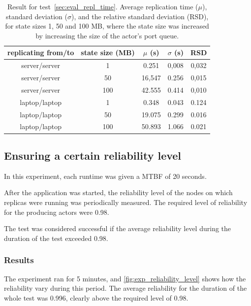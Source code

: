 \documentclass{cslthse-msc}
\begin{document}
\begin{table}[h!]
	\begin{center}
	\begin{tabular}{| c | c | c | c | c |}
	 \hline
	 replicating from/to & state size (MB) & $\mu$ (s) & $\sigma$ (s) & RSD \\
	 \hline		%
	  server/server & 1 & 0.251 & 0,008 & 0,032 \\
	  server/server & 50 & 16,547 & 0.256 & 0,015 \\
	  server/server & 100 & 42.555 & 0.414 & 0,010 \\
	  laptop/laptop & 1 & 0.348 & 0.043 & 0.124 \\
	  laptop/laptop & 50 & 19.075 & 0.299 & 0.016 \\
	  laptop/laptop & 100 & 50.893 & 1.066 & 0.021 \\
	   \hline
	\end{tabular}
	 \caption{Result for test~\ref{sec:eval_repl_time}. Average replication time ($\mu$), standard deviation ($\sigma$), and the relative standard deviation (RSD), for state sizes 1, 50 and 100 MB, where the state size was increased by increasing the size of the actor's port queue.}
	 \label{table:replication_time_variation_queue}
	 \end{center}
 \end{table}
 

\subsection{Ensuring a certain reliability level} \label{sec:eval_rel_level}
In this experiment, each runtime was given a MTBF of 20 seconds.

After the application was started, the reliability level of the nodes on which replicas were running was periodically measured. The required level of reliability for the producing actors were 0.98.

The test was considered successful if the average reliability level during the duration of the test exceeded 0.98. %

\subsubsection*{Results}
The experiment ran for 5 minutes, and \cref{fig:exp_reliability_level} shows how the reliability vary during this period. The average reliability for the duration of the whole test was 0.996, clearly above the required level of 0.98.
\end{document}
